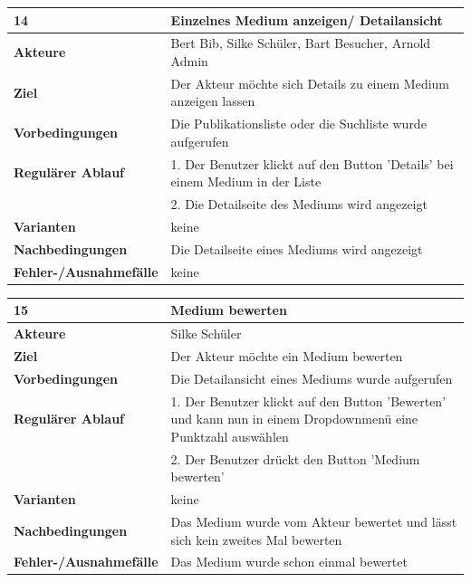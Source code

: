 \documentclass[fontsize=12pt,paper=a4,twoside]{scrartcl}
\begin{document}
\begin{table}[htbp]
\label{14}
\begin{tabular}{|l|p{10cm}|}
\hline 
\textbf{14} & \textbf{Einzelnes Medium anzeigen/ Detailansicht} \\ \hline
\textbf{Akteure} & Bert Bib, Silke Schüler, Bart Besucher, Arnold Admin\\ \hline
\textbf{Ziel} & Der Akteur möchte sich Details zu einem Medium anzeigen lassen \\ \hline
\textbf{Vorbedingungen} & Die Publikationsliste oder die Suchliste wurde aufgerufen \\ \hline
\textbf{Regulärer Ablauf} & 
1. Der Benutzer klickt auf den Button 'Details' bei einem Medium in der Liste \\
&2. Die Detailseite des Mediums wird angezeigt\\
\hline
\textbf{Varianten} & 
keine \\ \hline
\textbf{Nachbedingungen} & Die Detailseite eines Mediums wird angezeigt\\ \hline
\textbf{Fehler-/Ausnahmefälle} & keine\\
\hline
\end{tabular}
\end{table}

\newpage

\begin{table}[htbp]
\label{15}
\begin{tabular}{|l|p{10cm}|}
\hline 
\textbf{15} & \textbf{Medium bewerten} \\ \hline
\textbf{Akteure} & Silke Schüler\\ \hline
\textbf{Ziel} & Der Akteur möchte ein Medium bewerten \\ \hline
\textbf{Vorbedingungen} & Die Detailansicht eines Mediums wurde aufgerufen \\ \hline
\textbf{Regulärer Ablauf} & 
1. Der Benutzer klickt auf den Button 'Bewerten' und kann nun in einem Dropdownmenü eine Punktzahl 
auswählen\\
&2. Der Benutzer drückt den Button 'Medium bewerten'\\
\hline
\textbf{Varianten} & 
keine \\ \hline
\textbf{Nachbedingungen} & Das Medium wurde vom Akteur bewertet und lässt sich kein zweites Mal 
bewerten\\ \hline
\textbf{Fehler-/Ausnahmefälle} & Das Medium wurde schon einmal bewertet\\
\hline
\end{tabular}
\end{table}
\end{document}
